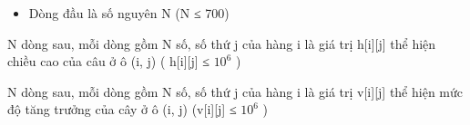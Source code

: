 \begin{itemize}
	\item     Dòng đầu là số nguyên N (N ≤ 700)   
\end{itemize}

   N dòng sau, mỗi dòng gồm N số, số thứ j của hàng i là giá trị h[i][j] thể hiện chiều cao của câu ở ô (i, j) ( h[i][j] ≤ $10^{6}$   )  

   N dòng sau, mỗi dòng gồm N số, số thứ j của hàng i là giá trị v[i][j] thể hiện mức độ tăng trưởng của cây ở ô (i, j) (v[i][j] ≤ $10^{6}$   )